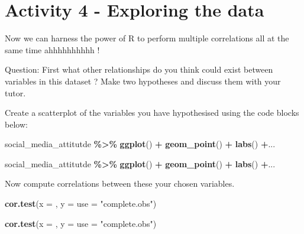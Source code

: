 \documentclass[
]{book}
\newenvironment{Shaded}{\begin{snugshade}}{\end{snugshade}}
\newcommand{\AttributeTok}[1]{\textcolor[rgb]{0.13,0.29,0.53}{#1}}
\newcommand{\FunctionTok}[1]{\textcolor[rgb]{0.13,0.29,0.53}{\textbf{#1}}}
\newcommand{\NormalTok}[1]{#1}
\newcommand{\SpecialCharTok}[1]{\textcolor[rgb]{0.81,0.36,0.00}{\textbf{#1}}}
\newcommand{\StringTok}[1]{\textcolor[rgb]{0.31,0.60,0.02}{#1}}
\begin{document}
\section{Activity 4 - Exploring the data}\label{activity-4---exploring-the-data}

Now we can harness the power of R to perform multiple correlations all at the same time ahhhhhhhhhh !

Question: First what other relationships do you think could exist between variables in this dataset ? Make two hypotheses and discuss them with your tutor.

Create a scatterplot of the variables you have hypothesised using the code blocks below:

\begin{Shaded}
\begin{Highlighting}[]
\NormalTok{social\_media\_attitutde }\SpecialCharTok{\%\textgreater{}\%} 
  \FunctionTok{ggplot}\NormalTok{() }\SpecialCharTok{+}
  \FunctionTok{geom\_point}\NormalTok{() }\SpecialCharTok{+}
  \FunctionTok{labs}\NormalTok{() }\SpecialCharTok{+}\NormalTok{...}
\end{Highlighting}
\end{Shaded}

\begin{Shaded}
\begin{Highlighting}[]
\NormalTok{social\_media\_attitutde }\SpecialCharTok{\%\textgreater{}\%} 
  \FunctionTok{ggplot}\NormalTok{() }\SpecialCharTok{+}
  \FunctionTok{geom\_point}\NormalTok{() }\SpecialCharTok{+}
  \FunctionTok{labs}\NormalTok{() }\SpecialCharTok{+}\NormalTok{...}
\end{Highlighting}
\end{Shaded}

Now compute correlations between these your chosen variables.

\begin{Shaded}
\begin{Highlighting}[]
\FunctionTok{cor.test}\NormalTok{(}\AttributeTok{x =}\NormalTok{ , }\AttributeTok{y =}  \AttributeTok{use =} \StringTok{"complete.obs"}\NormalTok{)}
\end{Highlighting}
\end{Shaded}

\begin{Shaded}
\begin{Highlighting}[]
\FunctionTok{cor.test}\NormalTok{(}\AttributeTok{x =}\NormalTok{ , }\AttributeTok{y =}  \AttributeTok{use =} \StringTok{"complete.obs"}\NormalTok{)}
\end{Highlighting}
\end{Shaded}
\end{document}
